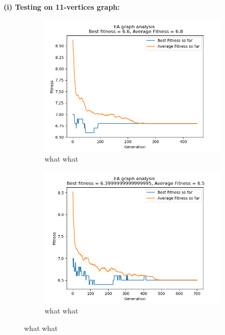 \documentclass[conference,compsoc]{IEEEtran}
\begin{document}
\begin{center}
  \textbf{(i) Testing on 11-vertices graph:}
\end{center}
\setlength{\parskip}{0 em}
\begin{figure}[h]
  \vspace{-1 em}
  \centering 
  \begin{subfigure}{0.34\textwidth}
    \includegraphics[width=\linewidth]{../Results/_11_FPS_Truncation_100_50_450.png}
    \caption{what what}
  \end{subfigure}
  \begin{subfigure}{0.34\textwidth}
    \includegraphics[width=\linewidth]{../Results/_11_BT_Truncation_100_50_700.png}
    \caption{what what}

\end{subfigure}
\end{figure}
\end{document}
